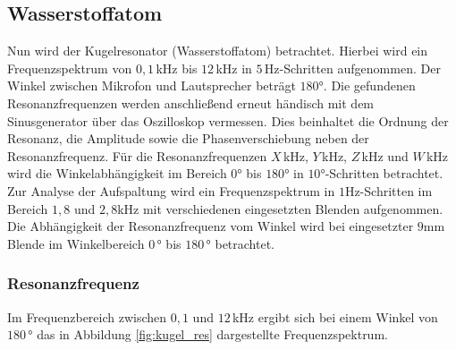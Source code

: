 \begin{figure}[H]
    \hfil
    \caption{}\label{figure}
\end{figure}

\subsection{Wasserstoffatom}
Nun wird der Kugelresonator (Wasserstoffatom) betrachtet. Hierbei wird ein Frequenzspektrum
von $0,1\,$kHz bis $12\,$kHz in $5\,$Hz-Schritten aufgenommen. Der Winkel zwischen Mikrofon und Lautsprecher beträgt $180°$.
Die gefundenen Resonanzfrequenzen werden anschließend erneut händisch mit dem Sinusgenerator über das Oszilloskop vermessen.
Dies beinhaltet die Ordnung der Resonanz, die Amplitude sowie die Phasenverschiebung neben der Resonanzfrequenz.
Für die Resonanzfrequenzen $X\,$kHz, $Y\,$kHz, $Z\,$kHz und $W\,$kHz wird die Winkelabhängigkeit im Bereich $0°$ bis $180°$ in $10°$-Schritten betrachtet.\\
Zur Analyse der Aufspaltung wird ein Frequenzspektrum in $1$Hz-Schritten im Bereich $1,8$ und $2,8$kHz mit verschiedenen eingesetzten Blenden aufgenommen.
Die Abhängigkeit der Resonanzfrequenz vom Winkel wird bei eingesetzter $9$mm Blende im Winkelbereich $0\,°$ bis $180\,°$ betrachtet.

\subsubsection*{Resonanzfrequenz}
Im Frequenzbereich zwischen $0,1$ und $12\,$kHz ergibt sich bei einem Winkel von $180\,°$ das in Abbildung \ref{fig:kugel_res}
dargestellte Frequenzspektrum.

